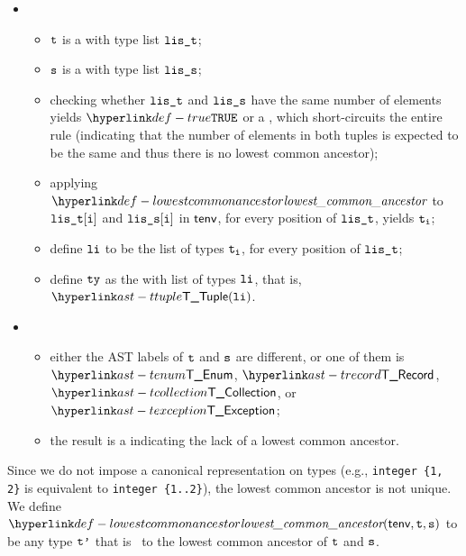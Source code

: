 \begin{itemize}
\begin{itemize}
\begin{itemize}
      \item {}
      \begin{itemize}
        \item $\vt$ is a \tupletypeterm{} with type list $\vlit$;
        \item $\vs$ is a \tupletypeterm{} with type list $\vlis$;
        \item checking whether $\vlit$ and $\vlis$ have the same number of elements yields $\True$
              or a \typingerrorterm{}, which short-circuits the entire rule (indicating that the number of elements in both tuples is expected
              to be the same and thus there is no lowest common ancestor);
        \item applying $\lca$ to $\vlit[\vi]$ and $\vlis[\vi]$ in $\tenv$, for every position of $\vlit$,
              yields $\vt_\vi$\ProseOrTypeError;
        \item define $\vli$ to be the list of types $\vt_\vi$, for every position of $\vlit$;
        \item define $\tty$ as the \tupletypeterm{} with list of types $\vli$, that is, $\TTuple(\vli)$.
      \end{itemize}

      \item {}
      \begin{itemize}
        \item either the AST labels of $\vt$ and $\vs$ are different, or one of them is $\TEnum$, $\TRecord$, $\TCollection$, or $\TException$;
        \item the result is a \typingerrorterm{} indicating the lack of a lowest common ancestor.
      \end{itemize}
    \end{itemize}
  \end{itemize}
\end{itemize}

\FormallyParagraph
Since we do not impose a canonical representation on types (e.g., \verb|integer {1, 2}| is equivalent to \verb|integer {1..2}|),
the lowest common ancestor is not unique.
We define $\lca(\tenv, \vt, \vs)$ to be any type $\vtp$ that is \typeequivalent\ to the lowest common ancestor of $\vt$ and $\vs$.

\begin{mathpar}
\end{mathpar}

